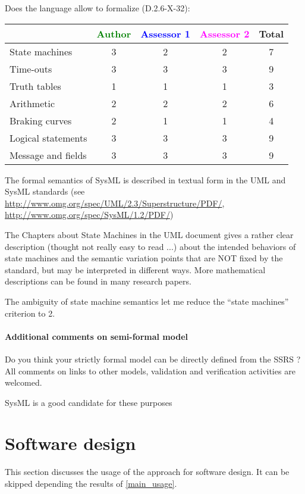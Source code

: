Does the language allow to formalize (D.2.6-X-32):

\begin{tabular}{|l | c | c | c | c|}
\hline
& \textcolor{green}{Author} & \textcolor{blue}{Assessor 1} & \textcolor{magenta}{Assessor 2} & Total \\
\hline 
State machines  &3 & 2& 2& 7 \\
\hline
Time-outs  &3 & 3& 3& 9 \\
\hline
Truth tables  &1 & 1& 1& 3 \\
\hline
Arithmetic  & 2& 2& 2& 6 \\
\hline
Braking curves  &2 & 1& 1& 4 \\
\hline
Logical statements &3 & 3& 3& 9 \\
\hline
Message and fields &3 & 3& 3& 9 \\
\hline
\end{tabular}
\begin{author_comment}

The formal semantics of SysML is described in textual form in the UML and SysML standards
(see \url{http://www.omg.org/spec/UML/2.3/Superstructure/PDF/}, \url{http://www.omg.org/spec/SysML/1.2/PDF/})

The Chapters about State Machines in the UML
document gives a rather clear description (thought not really easy
to read ...) about the intended behaviors of state machines and the
semantic variation points that are NOT fixed by the standard, but may
be interpreted in different ways. More mathematical descriptions can
be found in  many research papers.
\end{author_comment}

\begin{assessor1}
The ambiguity of state machine semantics let me reduce the "`state machines"' criterion to 2. 
\end{assessor1}


\paragraph{Additional comments on semi-formal  model} Do you think your strictly formal  model can be directly defined from the SSRS ?
All comments on links to  other models, validation and verification activities are welcomed.

\begin{author_comment}
SysML is a good candidate for these purposes
\end{author_comment}
\section{Software design}
This section discusses the usage of the approach for software design.
It can be skipped depending the results of \ref{main_usage}.

